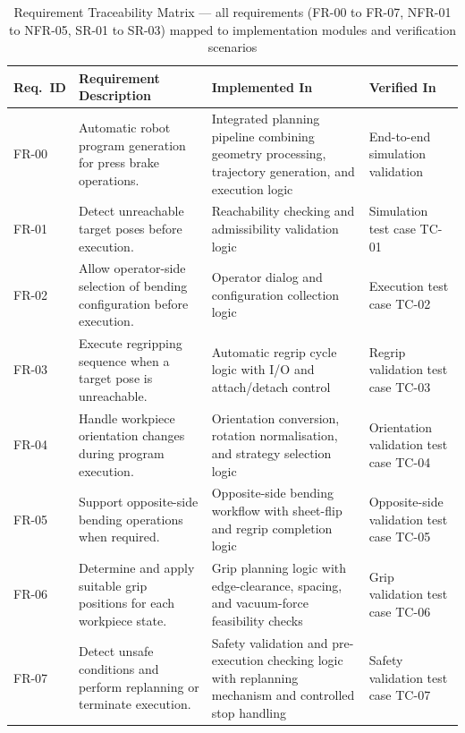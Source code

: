 \begin{table}[htbp]
\centering
\caption{Requirement Traceability Matrix --- all requirements (FR-00 to FR-07, NFR-01 to NFR-05, SR-01 to SR-03) mapped to implementation modules and verification scenarios}
\label{tab:req_traceability_matrix}
\setlength{\tabcolsep}{4pt}
\renewcommand{\arraystretch}{1.05}
\scriptsize
{}
\begin{tabularx}{\textwidth}{
L{1.4cm}
L{4.2cm}
L{5.2cm}
L{3.2cm}
}
\toprule
\textbf{Req.\ ID} &
\textbf{Requirement Description} &
\textbf{Implemented In} &
\textbf{Verified In} \\
\midrule


FR-00 &
Automatic robot program generation for press brake operations. &
Integrated planning pipeline combining geometry processing, trajectory generation, and execution logic &
End-to-end simulation validation \\

FR-01 &
Detect unreachable target poses before execution. &
Reachability checking and admissibility validation logic &
Simulation test case TC-01 \\

FR-02 &
Allow operator-side selection of bending configuration before execution. &
Operator dialog and configuration collection logic &
Execution test case TC-02 \\

FR-03 &
Execute regripping sequence when a target pose is unreachable. &
Automatic regrip cycle logic with I/O and attach/detach control &
Regrip validation test case TC-03 \\

FR-04 &
Handle workpiece orientation changes during program execution. &
Orientation conversion, rotation normalisation, and strategy selection logic &
Orientation validation test case TC-04 \\

FR-05 &
Support opposite-side bending operations when required. &
Opposite-side bending workflow with sheet-flip and regrip completion logic &
Opposite-side validation test case TC-05 \\

FR-06 &
Determine and apply suitable grip positions for each workpiece state. &
Grip planning logic with edge-clearance, spacing, and vacuum-force feasibility checks &
Grip validation test case TC-06 \\

FR-07 &
Detect unsafe conditions and perform replanning or terminate execution. &
Safety validation and pre-execution checking logic with replanning mechanism and controlled stop handling &
Safety validation test case TC-07 \\


\end{tabularx}
\end{table}
